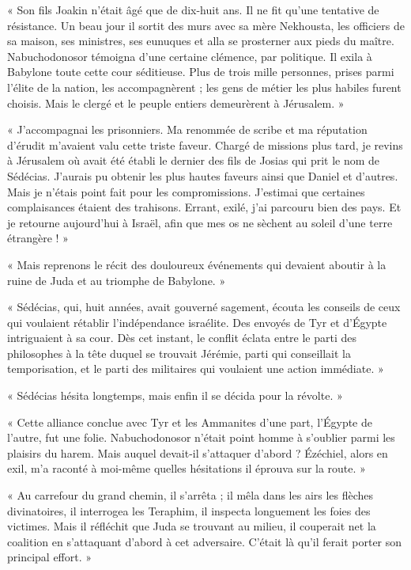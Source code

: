 \documentclass[a4paper, 11pt, oneside, polutonikogreek, french]{article}
\begin{document}
« Son fils Joakin n'était âgé que de dix-huit ans. Il ne fit qu'une tentative de résistance. Un beau jour il sortit des murs avec sa mère Nekhousta, les officiers de sa maison, ses ministres, ses eunuques et alla se prosterner aux pieds du maître. Nabuchodonosor témoigna d'une certaine clémence, par politique. Il exila à Babylone toute cette cour séditieuse. Plus de trois mille personnes, prises parmi l'élite de la nation, les accompagnèrent ; les gens de métier les plus habiles furent choisis. Mais le clergé et le peuple entiers demeurèrent à Jérusalem. »

« J'accompagnai les prisonniers. Ma renommée de scribe et ma réputation d'érudit m'avaient valu cette triste faveur. Chargé de missions plus tard, je revins à Jérusalem où avait été établi le dernier des fils de Josias qui prit le nom de Sédécias. J'aurais pu obtenir les plus hautes faveurs ainsi que Daniel et d'autres. Mais je n'étais point fait pour les compromissions. J'estimai que certaines complaisances étaient des trahisons. Errant, exilé, j'ai parcouru bien des pays. Et je retourne aujourd'hui à Israël, afin que mes os ne sèchent au soleil d'une terre étrangère ! »

\bigskip
\centerline{\EightStarTaper}
\centerline{\EightStarTaper\EightStarTaper}
\bigskip

« Mais reprenons le récit des douloureux événements qui devaient aboutir à la ruine de Juda et au triomphe de Babylone. »

« Sédécias, qui, huit années, avait gouverné sagement, écouta les conseils de ceux qui voulaient rétablir l'indépendance israélite. Des envoyés de Tyr et d'Égypte intriguaient à sa cour. Dès cet instant, le conflit éclata entre le parti des philosophes à la tête duquel se trouvait Jérémie, parti qui conseillait la temporisation, et le parti des militaires qui voulaient une action immédiate. »

« Sédécias hésita longtemps, mais enfin il se décida pour la révolte. »

« Cette alliance conclue avec Tyr et les Ammanites d'une part, l'Égypte de l'autre, fut une folie. Nabuchodonosor n'était point homme à s'oublier parmi les plaisirs du harem. Mais auquel devait-il s'attaquer d'abord ? Ézéchiel, alors en exil, m'a raconté à moi-même quelles hésitations il éprouva sur la route. »

« Au carrefour du grand chemin, il s'arrêta ; il mêla dans les airs les flèches divinatoires, il interrogea les Teraphim, il inspecta longuement les foies des victimes. Mais il réfléchit que Juda se trouvant au milieu, il couperait net la coalition en s'attaquant d'abord à cet adversaire. C'était là qu'il ferait porter son principal effort. »
\end{document}
